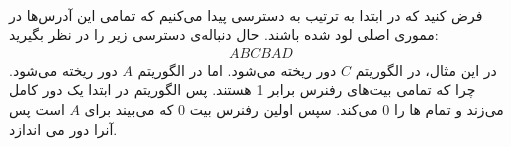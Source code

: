 \\\noindent
فرض کنید که در ابتدا به ترتیب به
دسترسی پیدا می‌کنیم که تمامی این آدرس‌ها در مموری اصلی لود شده باشند.
حال دنباله‌ی دسترسی زیر را در نظر بگیرید:
\begin{gather*}
    ABCBAD
\end{gather*}
در این مثال، در الگوریتم
$C$
دور ریخته می‌شود. اما در الگوریتم
$A$
دور ریخته می‌شود. چرا که تمامی بیت‌های رفنرس برابر 1 هستند. پس الگوریتم در ابتدا یک دور کامل می‌زند و تمام
ها
را 0 می‌کند. سپس اولین رفنرس بیت 0 که می‌بیند برای
$A$
است پس آنرا دور می ‌اندازد.



